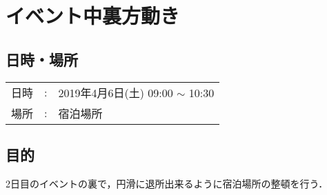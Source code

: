 %

\section{イベント中裏方動き}

\subsection{日時・場所}
\begin{tabular}{p{}rp{}}
  日時 & : & 2019年4月6日(土) 09:00 $\sim$ 10:30\\
  場所 & : & 宿泊場所
\end{tabular}

\subsection{目的}
2日目のイベントの裏で，円滑に退所出来るように宿泊場所の整頓を行う．


